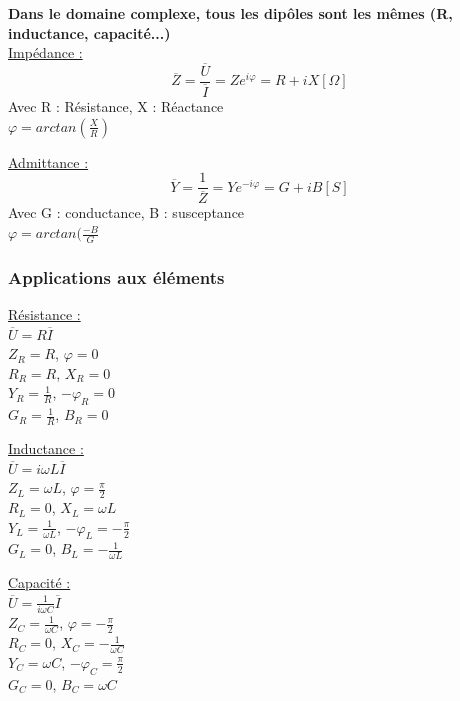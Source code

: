 \documentclass[../main.tex]{subfiles}
\begin{document}
\textbf{Dans le domaine complexe, tous les dipôles sont les mêmes (R, inductance, capacité...)}\\
\quad \underline{Impédance :}
\begin{equation}
    \overline{Z} = \frac{\overline{U}}{\overline{I}} = Z e^{i\varphi} = R +iX [\Omega]
\end{equation}
Avec R : Résistance, X : Réactance\\
$\varphi = arctan(\frac{X}{R})$

\quad \underline{Admittance :}
\begin{equation}
    \overline{Y} = \frac{1}{\overline{Z}} = Y e^{-i\varphi} = G + iB [S]
\end{equation}
Avec G : conductance, B : susceptance\\
$\varphi = arctan(\frac{-B}{G}$



\subsubsection{Applications aux éléments}
\begin{minipage}{.3\textwidth}
    \quad \underline{Résistance :}\\
$\overline{U} = R \overline{I}$\\
$Z_R = R$, $\varphi = 0$\\
$R_R = R$, $X_R = 0$\\
$Y_R = \frac{1}{R}$, $-\varphi_R = 0$\\
$G_R = \frac{1}{R}$, $B_R = 0$\\
\end{minipage}
\vline
\begin{minipage}{.3\textwidth}
    \quad \underline{Inductance :}\\
$\overline{U} = i\omega L \overline{I}$\\
$Z_L = \omega L$, $\varphi = \frac{\pi}{2}$\\
$R_L = 0$, $X_L = \omega L$\\
$Y_L = \frac{1}{\omega L}$, $-\varphi_L = -\frac{\pi}{2}$\\
$G_L = 0$, $B_L = -\frac{1}{\omega L}$\\
\end{minipage}
\vline
\begin{minipage}{.3\textwidth}
    \quad \underline{Capacité :}\\
$\overline{U} = \frac{1}{i \omega C}\overline{I}$\\
$Z_C = \frac{1}{\omega C}$, $\varphi = -\frac{\pi}{2}$\\
$R_C = 0$, $X_C = -\frac{1}{\omega C}$\\
$Y_C = \omega C$, $-\varphi_C = \frac{\pi}{2}$\\
$G_C = 0$, $B_C = \omega C$\\
\end{minipage}
\end{document}
